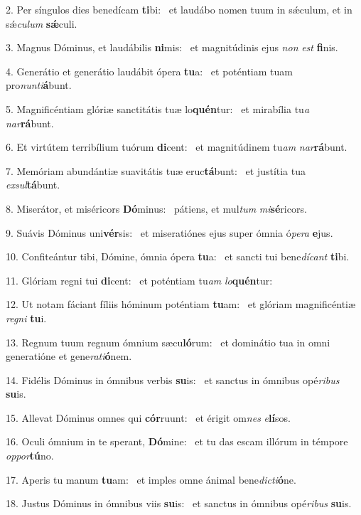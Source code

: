 2. Per síngulos dies benedícam \textbf{ti}bi: \ast\  et laudábo nomen tuum in sǽculum, et in sǽ\textit{cu}\textit{lum} \textbf{sǽ}culi.\

3. Magnus Dóminus, et laudábilis \textbf{ni}mis: \ast\  et magnitúdinis ejus \textit{non} \textit{est} \textbf{fi}nis.\

4. Generátio et generátio laudábit ópera \textbf{tu}a: \ast\  et poténtiam tuam pro\textit{nun}\textit{ti}\textbf{á}bunt.\

5. Magnificéntiam glóriæ sanctitátis tuæ lo\textbf{quén}tur: \ast\  et mirabília tu\textit{a} \textit{nar}\textbf{rá}bunt.\

6. Et virtútem terribílium tuórum \textbf{di}cent: \ast\  et magnitúdinem tu\textit{am} \textit{nar}\textbf{rá}bunt.\

7. Memóriam abundántiæ suavitátis tuæ eruc\textbf{tá}bunt: \ast\  et justítia tua \textit{ex}\textit{sul}\textbf{tá}bunt.\

8. Miserátor, et miséricors \textbf{Dó}minus: \ast\  pátiens, et mul\textit{tum} \textit{mi}\textbf{sé}ricors.\

9. Suávis Dóminus uni\textbf{vér}sis: \ast\  et miseratiónes ejus super ómnia ó\textit{pe}\textit{ra} \textbf{e}jus.\

10. Confiteántur tibi, Dómine, ómnia ópera \textbf{tu}a: \ast\  et sancti tui bene\textit{dí}\textit{cant} \textbf{ti}bi.\

11. Glóriam regni tui \textbf{di}cent: \ast\  et poténtiam tu\textit{am} \textit{lo}\textbf{quén}tur:\

12. Ut notam fáciant fíliis hóminum poténtiam \textbf{tu}am: \ast\  et glóriam magnificéntiæ \textit{re}\textit{gni} \textbf{tu}i.\

13. Regnum tuum regnum ómnium sæcu\textbf{ló}rum: \ast\  et dominátio tua in omni generatióne et gene\textit{ra}\textit{ti}\textbf{ó}nem.\

14. Fidélis Dóminus in ómnibus verbis \textbf{su}is: \ast\  et sanctus in ómnibus opé\textit{ri}\textit{bus} \textbf{su}is.\

15. Allevat Dóminus omnes qui \textbf{cór}ruunt: \ast\  et érigit om\textit{nes} \textit{e}\textbf{lí}sos.\

16. Oculi ómnium in te sperant, \textbf{Dó}mine: \ast\  et tu das escam illórum in témpore \textit{op}\textit{por}\textbf{tú}no.\

17. Aperis tu manum \textbf{tu}am: \ast\  et imples omne ánimal bene\textit{dic}\textit{ti}\textbf{ó}ne.\

18. Justus Dóminus in ómnibus viis \textbf{su}is: \ast\  et sanctus in ómnibus opé\textit{ri}\textit{bus} \textbf{su}is.\

